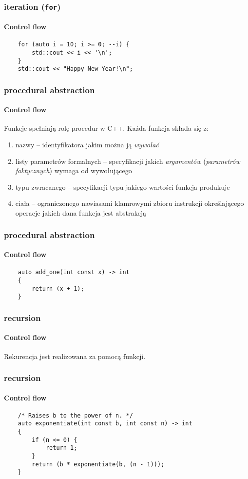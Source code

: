 \documentclass[aspectratio=169]{beamer}
\begin{document}
\begin{frame}[fragile]
    \frametitle{iteration ({\tt for})}
    \framesubtitle{Control flow}

    \begin{lstlisting}
    for (auto i = 10; i >= 0; --i) {
        std::cout << i << '\n';
    }
    std::cout << "Happy New Year!\n";
    \end{lstlisting}
\end{frame}

\begin{frame}
    \frametitle{procedural abstraction}
    \framesubtitle{Control flow}

    Funkcje spełniają rolę procedur w C++. Każda funkcja składa się z:

    \begin{enumerate}
        \item nazwy -- identyfikatora jakim można ją \emph{wywołać}
        \item listy parametrów formalnych -- specyfikacji jakich
            \emph{argumentów} (\emph{parametrów faktycznych}) wymaga od
            wywołującego
        \item typu zwracanego -- specyfikacji typu jakiego wartości funkcja
            produkuje
        \item ciała -- ograniczonego nawiasami klamrowymi zbioru instrukcji
            określającego operacje jakich dana funkcja jest abstrakcją
    \end{enumerate}
\end{frame}

\begin{frame}[fragile]
    \frametitle{procedural abstraction}
    \framesubtitle{Control flow}

    \begin{lstlisting}
    auto add_one(int const x) -> int
    {
        return (x + 1);
    }
    \end{lstlisting}
\end{frame}

\begin{frame}
    \frametitle{recursion}
    \framesubtitle{Control flow}

    Rekurencja jest realizowana za pomocą funkcji.
\end{frame}

\begin{frame}[fragile]
    \frametitle{recursion}
    \framesubtitle{Control flow}

    \begin{lstlisting}
    /* Raises b to the power of n. */
    auto exponentiate(int const b, int const n) -> int
    {
        if (n <= 0) {
            return 1;
        }
        return (b * exponentiate(b, (n - 1)));
    }
    \end{lstlisting}
\end{frame}
\end{document}
